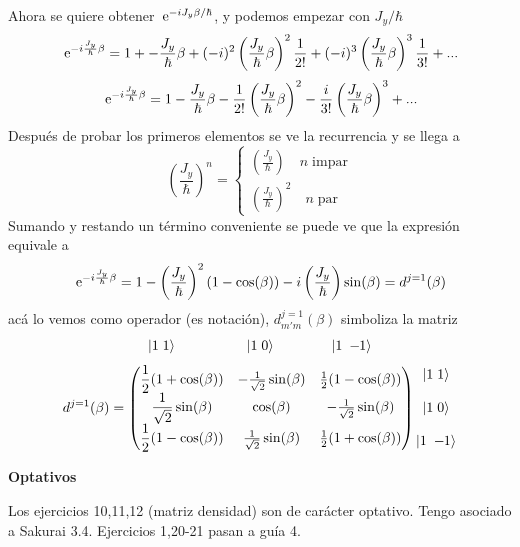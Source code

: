 \documentclass[10pt,oneside]{CBFT_book}
\begin{document}
Ahora se quiere obtener $\:\mathrm{e}^{-i J_y \beta/\hbar}$, y podemos empezar con $J_y/\hbar$
\[
	\:\mathrm{e}^{-i\frac{J_y}{\hbar}\beta} = 1 + -\frac{J_y}{\hbar}\beta + 
		(-i)^2\left(\frac{J_y}{\hbar}\beta\right)^2\frac{1}{2!} + 
		(-i)^3\left(\frac{J_y}{\hbar}\beta\right)^3\frac{1}{3!} + ...
\]
\[
	\:\mathrm{e}^{-i\frac{J_y}{\hbar}\beta} = 1 - \frac{J_y}{\hbar}\beta -
		\frac{1}{2!} \left(\frac{J_y}{\hbar}\beta\right)^2 -
		\frac{i}{3!}\left(\frac{J_y}{\hbar}\beta\right)^3 + ...
\]
Después de probar los primeros elementos se ve la recurrencia y se llega a 
\[
	\left( \frac{J_y}{\hbar} \right)^n = \begin{cases}
	                                      \left( \frac{J_y}{\hbar} \right) \quad n \; \text{impar} \\
	                                      \left( \frac{J_y}{\hbar} \right)^2 \quad n \; \text{par}
	                                     \end{cases}
\]
Sumando y restando un término conveniente se puede ve que la expresión equivale
a
\[
	\:\mathrm{e}^{-i\frac{J_y}{\hbar}\beta} = 1 -  \left( \frac{J_y}{\hbar} \right)^2 (1-\cos(\beta)) -
	i \left( \frac{J_y}{\hbar} \right) \sin(\beta)  = d^{j=1}(\beta)
\]
acá lo vemos como operador (es notación), $d_{m'm}^{j=1}(\beta)$ simboliza la matriz
\[
	\begin{matrix} \Ket{1\;1} \qquad\qquad\quad \Ket{1\;0} \qquad\qquad \Ket{1\;-\kern-1mm 1} \end{matrix}
\]
\[
	d^{j=1}(\beta) =
	\begin{pmatrix}
	\displaystyle \frac{1}{2}( 1 + \cos(\beta)) & -\frac{1}{\sqrt{2}}\sin(\beta) & \frac{1}{2}( 1 - 
\cos(\beta) ) \\
	\displaystyle{\frac{1}{\sqrt{2}}\sin(\beta)} & \cos(\beta) & -\frac{1}{\sqrt{2}}\sin(\beta) \\
	\displaystyle{\frac{1}{2}(1 - \cos(\beta))} & \frac{1}{\sqrt{2}}\sin(\beta) & \frac{1}{2}  ( 1 + 
\cos(\beta) )
	\end{pmatrix} \begin{matrix} \Ket{1\;1} \\ \\ \Ket{1\;0} \\ \\ \Ket{1\;-\kern-1mm 1} \end{matrix}
\]

\begin{ejemplo}{\bf Optativos}
 
Los ejercicios 10,11,12 (matriz densidad) son de carácter optativo. Tengo asociado a Sakurai 3.4.
Ejercicios 1,20-21 pasan a guía 4.
 
\end{ejemplo}
\end{document}

